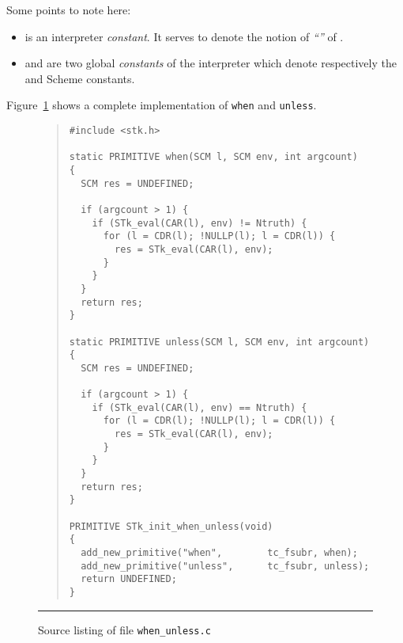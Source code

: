 \documentclass[10pt]{article}
\begin{document}
\noindent
Some points to note here:
\begin{itemize}
\item {} is an interpreter {\em constant}. It serves to denote
the notion of {\em ``''} of {\rrrr}.
\item {} and  are two global {\em constants} of the
interpreter which denote respectively the  and  Scheme
constants.
\end{itemize}

\noindent
Figure~\ref{when} shows a complete implementation of {\tt when} and {\tt unless}.

\begin{figure}
\begin{quote}\footnotesize
\begin{verbatim}
#include <stk.h>

static PRIMITIVE when(SCM l, SCM env, int argcount)
{
  SCM res = UNDEFINED;

  if (argcount > 1) {
    if (STk_eval(CAR(l), env) != Ntruth) {
      for (l = CDR(l); !NULLP(l); l = CDR(l)) {
        res = STk_eval(CAR(l), env);
      }
    }
  }
  return res;
}

static PRIMITIVE unless(SCM l, SCM env, int argcount)
{
  SCM res = UNDEFINED;

  if (argcount > 1) {
    if (STk_eval(CAR(l), env) == Ntruth) {
      for (l = CDR(l); !NULLP(l); l = CDR(l)) {
        res = STk_eval(CAR(l), env);
      }
    }
  }
  return res;
}

PRIMITIVE STk_init_when_unless(void)
{
  add_new_primitive("when",        tc_fsubr, when);
  add_new_primitive("unless",      tc_fsubr, unless);
  return UNDEFINED;
}
\end{verbatim}
\end{quote}
{\caption{Source listing of file {\tt when\_unless.c}}}
\label{when}
\vskip2mm\hrule\vskip3mm
\end{figure}
\end{document}

